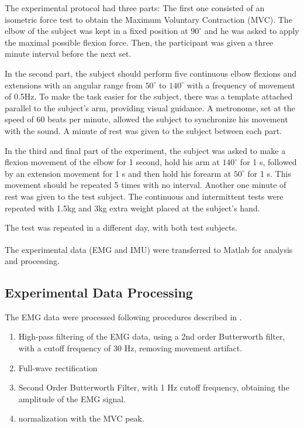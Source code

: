 \documentclass[letterpaper, 10 pt, conference]{ieeeconf}  %
\begin{document}

The experimental protocol had three parts: The first one consisted of an isometric force test to obtain the Maximum Voluntary Contraction (MVC). The elbow of the subject was kept in a fixed position at \(90^{\circ}\) and he was asked to apply the maximal possible flexion force. Then, the participant was given a three minute interval before the next set.

In the second part, the subject should perform five continuous elbow flexions and extensions with an angular range from  \(50^{\circ}\) to \(140^{\circ}\) with a frequency of movement of 0.5Hz. To make the task easier for the subject, there was a template attached parallel to the subject's arm, providing visual guidance. A metronome, set at the speed of 60 beats per minute, allowed the subject to synchronize his movement with the sound. A minute of rest was given to the subject between each part.

In the third and final part of the experiment, the subject was asked to make a flexion movement of the elbow for 1 second, hold his arm at \(140^{\circ}\) for 1 s, followed by an extension movement for 1 s and then hold his forearm at \(50^{\circ}\) for 1 s. This movement should be repeated 5 times with no interval. Another one minute of rest was given to the test subject. The continuous and intermittent tests were repeated with 1.5kg and 3kg extra weight placed at the subject's hand.

The test was repeated in a different day, with both test subjects.

The experimental data (EMG and IMU) were transferred to Matlab\textsuperscript{\textregistered} for analysis and processing.


\subsection{Experimental Data Processing}

The EMG data were processed following procedures described in \cite{Rose20161112,Hayashibe20091621}.
\begin{enumerate}
\item High-pass filtering of the EMG data, using a 2nd order Butterworth filter, with a cutoff frequency of 30 Hz, removing movement artifact.
\item Full-wave rectification
\item Second Order Butterworth Filter, with 1 Hz cutoff frequency, obtaining the amplitude of the EMG signal.
\item normalization with the MVC peak.
\end{enumerate}
\end{document}
